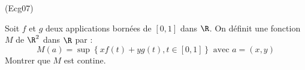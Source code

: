 \begin{tiny}(Ecg07)\end{tiny} Soit $f$ et $g$ deux applications bornées de $[0,1]$ dans $\R$. On définit une fonction $M$ de $\R^2$ dans $\R$ par :
\begin{displaymath}
 M(a)=\sup\left\lbrace xf(t)+yg(t),t\in [0,1] \right\rbrace \text{ avec } a=(x,y) 
\end{displaymath}
Montrer que $M$ est contine.